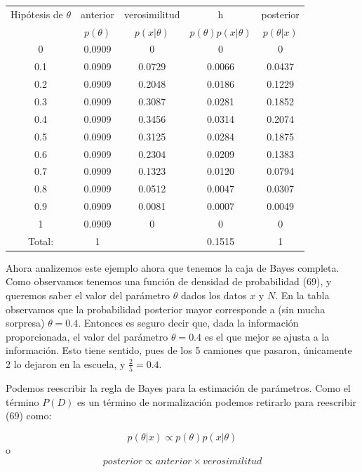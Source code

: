 \documentclass{article}
\begin{document}
\begin{center}
\begin{tabular}{ |c|c|c|c|c| } 
\hline
Hip\'otesis de $\theta$ & anterior & verosimilitud &  h  & posterior \\
 & $p(\theta)$ & $p(x\vert \theta)$ & $p(\theta)p(x\vert \theta)$ & $p(\theta\vert x)$ \\
\hline
0   & 0.0909 & 0 & 0 & 0 \\
0.1 & 0.0909 & 0.0729 & 0.0066 & 0.0437 \\
0.2 & 0.0909 & 0.2048 & 0.0186 & 0.1229 \\
0.3 & 0.0909 & 0.3087 & 0.0281 & 0.1852 \\
0.4 & 0.0909 & 0.3456 & 0.0314 & 0.2074 \\
0.5 & 0.0909 & 0.3125 & 0.0284 & 0.1875 \\
0.6 & 0.0909 & 0.2304 & 0.0209 & 0.1383 \\
0.7 & 0.0909 & 0.1323 & 0.0120 & 0.0794 \\
0.8 & 0.0909 & 0.0512 & 0.0047 & 0.0307 \\
0.9 & 0.0909 & 0.0081 & 0.0007 & 0.0049 \\
1   & 0.0909 & 0 & 0 & 0 \\
\hline
Total: & 1 &  & 0.1515 & 1 \\
\hline
\end{tabular}
\end{center}
Ahora analizemos este ejemplo ahora que tenemos la caja de Bayes completa. Como observamos tenemos una funci\'on de densidad de probabilidad (69), y queremos saber el valor del par\'ametro $\theta$ dados los datos $x$ y $N$. En la tabla observamos que la probabilidad posterior mayor corresponde a (sin mucha sorpresa) $\theta=0.4$. Entonces es seguro decir que, dada la informaci\'on proporcionada, el valor del par\'ametro $\theta=0.4$ es el que mejor se ajusta a la informaci\'on. Esto tiene sentido, pues de los 5 camiones que pasaron, \'unicamente 2 lo dejaron en la escuela, y $\frac{2}{5}=0.4$.

Podemos reescribir la regla de Bayes para la estimaci\'on de par\'ametros. Como el t\'ermino $P(D)$ es un t\'ermino de normalizaci\'on podemos retirarlo para reescribir (69) como:

\begin{equation}
p(\theta\vert x) \propto p(\theta)p(x\vert \theta)
\end{equation}
o
\begin{equation}
posterior \propto anterior \times verosimilitud
\end{equation}
\end{document}
